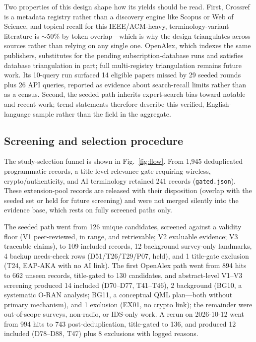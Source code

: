 Two properties of this design shape how its yields should be read. First, Crossref is a metadata registry rather than a discovery engine like Scopus or Web of Science, and topical recall for this IEEE/ACM-heavy, terminology-variant literature is $\sim$50\% by token overlap---which is why the design triangulates across sources rather than relying on any single one. OpenAlex, which indexes the same publishers, substitutes for the pending subscription-database runs and satisfies database triangulation in part; full multi-registry triangulation remains future work. Its 10-query run surfaced 14 eligible papers missed by 29 seeded rounds plus 26 API queries, reported as evidence about search-recall limits rather than as a census. Second, the seeded path inherits expert-search bias toward notable and recent work; trend statements therefore describe this verified, English-language sample rather than the field in the aggregate.

\subsection{Screening and selection procedure}
The study-selection funnel is shown in Fig.~\ref{fig:flow}. From 1,945 deduplicated programmatic records, a title-level relevance gate requiring wireless, crypto/authenticity, and AI terminology retained 241 records (\texttt{gated.json}). These extension-pool records are released with their disposition (overlap with the seeded set or held for future screening) and were not merged silently into the evidence base, which rests on fully screened paths only.

The seeded path went from 126 unique candidates, screened against a validity floor (V1 peer-reviewed, in range, and retrievable; V2 evaluable evidence; V3 traceable claims), to 109 included records, 12 background survey-only landmarks, 4 backup needs-check rows (D51/T26/T29/P07, held), and 1 title-gate exclusion (T24, EAP-AKA with no AI link). The first OpenAlex path went from 894 hits to 662 unseen records, title-gated to 130 candidates, and abstract-level V1--V3 screening produced 14 included (D70--D77, T41--T46), 2 background (BG10, a systematic O-RAN analysis; BG11, a conceptual QML plan---both without primary mechanism), and 1 exclusion (EX01, no crypto link); the remainder were out-of-scope surveys, non-radio, or IDS-only work. A rerun on 2026-10-12 went from 994 hits to 743 post-deduplication, title-gated to 136, and produced 12 included (D78--D88, T47) plus 8 exclusions with logged reasons.

